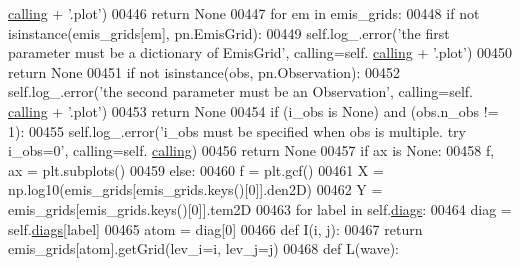 \begin{DoxyCode}
      \hyperlink{classpyneb_1_1core_1_1diags_1_1_diagnostics_a07dce673fec8b2383ef411ab94b0b2fe}{calling} + \textcolor{stringliteral}{'.plot'})
00446             \textcolor{keywordflow}{return} \textcolor{keywordtype}{None}
00447         \textcolor{keywordflow}{for} em \textcolor{keywordflow}{in} emis\_grids:
00448             \textcolor{keywordflow}{if} \textcolor{keywordflow}{not} isinstance(emis\_grids[em], pn.EmisGrid):
00449                 self.log\_.error(\textcolor{stringliteral}{'the first parameter must be a dictionary of EmisGrid'}, calling=self.
      \hyperlink{classpyneb_1_1core_1_1diags_1_1_diagnostics_a07dce673fec8b2383ef411ab94b0b2fe}{calling} + \textcolor{stringliteral}{'.plot'})
00450                 \textcolor{keywordflow}{return} \textcolor{keywordtype}{None}
00451         \textcolor{keywordflow}{if} \textcolor{keywordflow}{not} isinstance(obs, pn.Observation):
00452             self.log\_.error(\textcolor{stringliteral}{'the second parameter must be an Observation'}, calling=self.
      \hyperlink{classpyneb_1_1core_1_1diags_1_1_diagnostics_a07dce673fec8b2383ef411ab94b0b2fe}{calling} + \textcolor{stringliteral}{'.plot'})
00453             \textcolor{keywordflow}{return} \textcolor{keywordtype}{None}
00454         \textcolor{keywordflow}{if} (i\_obs \textcolor{keywordflow}{is} \textcolor{keywordtype}{None}) \textcolor{keywordflow}{and} (obs.n\_obs != 1):
00455             self.log\_.error(\textcolor{stringliteral}{'i\_obs must be specified when obs is multiple. try i\_obs=0'}, calling=self.
      \hyperlink{classpyneb_1_1core_1_1diags_1_1_diagnostics_a07dce673fec8b2383ef411ab94b0b2fe}{calling})
00456             \textcolor{keywordflow}{return} \textcolor{keywordtype}{None}
00457         \textcolor{keywordflow}{if} ax \textcolor{keywordflow}{is} \textcolor{keywordtype}{None}:
00458             f, ax = plt.subplots()
00459         \textcolor{keywordflow}{else}:
00460             f = plt.gcf()
00461         X = np.log10(emis\_grids[emis\_grids.keys()[0]].den2D)
00462         Y = emis\_grids[emis\_grids.keys()[0]].tem2D
00463         \textcolor{keywordflow}{for} label \textcolor{keywordflow}{in} self.\hyperlink{classpyneb_1_1core_1_1diags_1_1_diagnostics_a0c0f7e36097677f61a6a14a0c3127b02}{diags}:
00464             diag = self.\hyperlink{classpyneb_1_1core_1_1diags_1_1_diagnostics_a0c0f7e36097677f61a6a14a0c3127b02}{diags}[label]
00465             atom = diag[0]
00466             \textcolor{keyword}{def }I(i, j):
00467                 \textcolor{keywordflow}{return} emis\_grids[atom].getGrid(lev\_i=i, lev\_j=j)
00468             \textcolor{keyword}{def }L(wave):

\end{DoxyCode}
